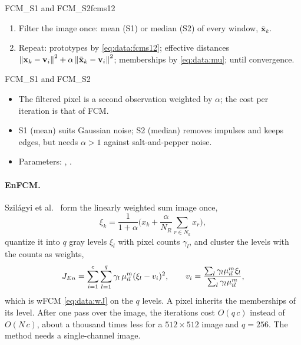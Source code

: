 \begin{algobox}{FCM\_S1 and FCM\_S2}{fcms12}
\begin{enumerate}[leftmargin=*]
  \item Filter the image once: mean (S1) or median (S2) of every window, $\bar{\mathbf{x}}_k$.
  \item Repeat: prototypes by \eqref{eq:data:fcms12}; effective distances $\left\lVert \mathbf{x}_k-\mathbf{v}_i \right\rVert^2+\alpha\left\lVert \bar{\mathbf{x}}_k-\mathbf{v}_i \right\rVert^2$; memberships by \eqref{eq:data:mu}; until convergence.
\end{enumerate}
\end{algobox}
\begin{summarybox}{FCM\_S1 and FCM\_S2}
\begin{itemize}
  \item The filtered pixel is a second observation weighted by $\alpha$; the cost per iteration is that of FCM.
  \item S1 (mean) suits Gaussian noise; S2 (median) removes impulses and keeps edges, but needs $\alpha>1$ against salt-and-pepper noise.
  \item Parameters: , .
\end{itemize}
\end{summarybox}

\paragraph{EnFCM.} Szil\'agyi et al.\ \cite{szilagyi:2003:enfcm} form the linearly weighted sum image once,
\begin{equation}
  \xi_k=\frac{1}{1+\alpha}\Big(x_k+\frac{\alpha}{N_R}\sum_{r\in N_k}x_r\Big),
  \label{eq:data:xi}
\end{equation}
quantize it into $q$ gray levels $\xi_l$ with pixel counts $\gamma_l$, and cluster the levels with the counts as weights,
\begin{equation}
  J_{En}=\sum_{i=1}^{c}\sum_{l=1}^{q}\gamma_l\,\mu_{il}^m(\xi_l-v_i)^2,\qquad
  v_i=\frac{\sum_l\gamma_l\mu_{il}^m\xi_l}{\sum_l\gamma_l\mu_{il}^m} ,
  \label{eq:data:enfcm}
\end{equation}
which is wFCM \eqref{eq:data:wJ} on the $q$ levels. A pixel inherits the memberships of its level. After one pass over the image, the iterations cost $O(q\,c)$ instead of $O(N\,c)$, about a thousand times less for a $512\times512$ image and $q=256$. The method needs a single-channel image.

